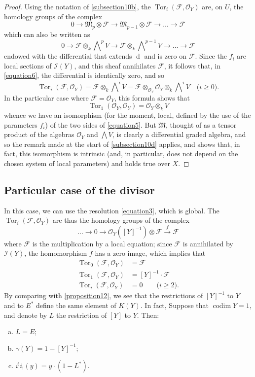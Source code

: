 \documentclass{article}
\theoremstyle{plain}
\newenvironment{proposition}[1]
    {\renewcommand\theinnercustomproposition{#1}\innercustomproposition}
    {\endinnercustomproposition}
\theoremstyle{definition}
\newcommand{\sh}[1]{{\mathscr{#1}}}
\newcommand{\dd}{\operatorname{d}\!}
\renewcommand{\geq}{\geqslant}
\DeclareMathOperator{\Tor}{Tor}
\DeclareMathOperator{\codim}{codim}
\begin{document}
\begin{proof}
  Using the notation of \cref{subsection10b}, the $\Tor_i(\sh{F},\sh{O}_Y)$ are, on $U$, the homology groups of the complex
  \[
    0\to\mathfrak{M}_p\otimes\sh{F}\to\mathfrak{M}_{p-1}\otimes\sh{F}\to\ldots\to\sh{F}
  \]
  which can also be written as
  \[
  \label{equation6}
    0 \to \sh{F}\otimes_k\bigwedge\nolimits^p V \to \sh{F}\otimes_k\bigwedge\nolimits^{p-1}V \to \ldots \to \sh{F}
    \tag{6}
  \]
  endowed with the differential that extends $\dd$ and is zero on $\sh{F}$.
  Since the $f_i$ are local sections of $\sh{I}(Y)$, and this sheaf annihilates $\sh{F}$, it follows that, in \cref{equation6}, the differential is identically zero, and so
  \[
    \Tor_i(\sh{F},\sh{O}_Y) = \sh{F}\otimes_k\bigwedge\nolimits^iV = \sh{F}\otimes_{\sh{O}_Y}\sh{O}_Y\otimes_k\bigwedge\nolimits^i V
    \quad\mbox{($i\geq0$).}
  \]
  In the particular case where $\sh{F}=\sh{O}_Y$, this formula shows that
  \[
    \Tor_1(\sh{O}_Y,\sh{O}_Y) = \sh{O}_Y\otimes_k V
  \]
  whence we have an isomorphism (for the moment, local, defined by the use of the parameters $f_i$) of the two sides of \cref{equation5}.
  But $\mathfrak{M}$, thought of as a tensor product of the algebras $\sh{O}_Y$ and $\bigwedge V$, is clearly a differential graded algebra, and so the remark made at the start of \cref{subsection10d} applies, and shows that, in fact, this isomorphism is intrinsic (and, in particular, does not depend on the chosen system of local parameters) and holds true over $X$.
\end{proof}


\subsection{Particular case of the divisor}
\label{subsection10e}

In this case, we can use the resolution \cref{equation3}, which is global.
The $\Tor_i(\sh{F},\sh{O}_Y)$ are thus the homology groups of the complex
\[
  \ldots \to 0 \to \sh{O}_Y([Y]^{-1})\otimes\sh{F} \xrightarrow{f}\sh{F}
\]
where $\sh{F}$ is the multiplication by a local equation;
since $\sh{F}$ is annihilated by $\sh{I}(Y)$, the homomorphism $f$ has a zero image, which implies that
\begin{align*}
  \Tor_0(\sh{F},\sh{O}_Y) &= \sh{F}
\\\Tor_1(\sh{F},\sh{O}_Y) &= [Y]^{-1}\cdot\sh{F}
\\\Tor_i(\sh{F},\sh{O}_Y) &= 0 \qquad\mbox{($i\geq2$).}
\end{align*}
By comparing with \cref{proposition12}, we see that the restrictions of $[Y]^{-1}$ to $Y$ and to $E^*$ define the same element of $K(Y)$.
In fact,
\begin{proposition}{13}
\label{proposition13}
  Suppose that $\codim Y=1$, and denote by $L$ the restriction of $[Y]$ to $Y$.
  Then:
  \begin{enumerate}[(a)]
    \item $L=E$;
    \item $\gamma(Y) = 1-[Y]^{-1}$;
    \item $i^!i_!(y) = y\cdot(1-L^*).$
  \end{enumerate}
\end{proposition}
\end{document}
